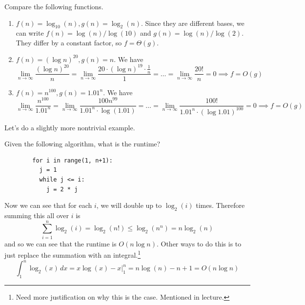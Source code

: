 \documentclass{article}
\begin{document}
    \begin{example}
      Compare the following functions. 
      \begin{enumerate}
        \item $f(n) = \log_{10} (n), g(n) = \log_2 (n)$. Since they are different bases, we can write $f(n) = \log (n) / \log (10)$ and $g(n) = \log(n) / \log(2)$. They differ by a constant factor, so $f = \Theta(g)$. 

        \item $f(n) = (\log n)^{20}, g(n) = n$. We have 
        \begin{equation}
          \lim_{n \rightarrow \infty} \frac{(\log n)^20}{n} = \lim_{n \rightarrow \infty} \frac{20 \cdot (\log n)^{19} \cdot \frac{1}{n}}{1} = \ldots = \lim_{n \rightarrow \infty} \frac{20!}{n} = 0 \implies f = O(g)
        \end{equation}

        \item $f(n) = n^{100}, g(n) = 1.01^n$. We have 
          \begin{equation}
            \lim_{n \rightarrow \infty} \frac{n^{100}}{1.01^n} = \lim_{n \rightarrow \infty} \frac{100 n^{99}}{1.01^n \cdot \log (1.01)} =  \ldots = \lim_{n \rightarrow \infty} \frac{100!}{1.01^n \cdot (\log 1.01)^100} = 0 \implies f = O(g)
          \end{equation}
      \end{enumerate}
    \end{example}

    Let's do a slightly more nontrivial example. 

    \begin{example}
      Given the following algorithm, what is the runtime? 
      \begin{lstlisting}
        for i in range(1, n+1): 
          j = 1 
          while j <= i: 
            j = 2 * j
      \end{lstlisting}
      Now we can see that for each $i$, we will double up to $\log_2 (i)$ times. Therefore summing this all over $i$ is 
      \begin{equation}
        \sum_{i = 1}^n \log_2 (i) = \log_2 (n!) \leq \log_2 (n^n) = n \log_2 (n)
      \end{equation}
      and so we can see that the runtime is $O(n \log n)$. Other ways to do this is to just replace the summation with an integral.\footnote{Need more justification on why this is the case. Mentioned in lecture.} 
      \begin{equation}
        \int_1^n \log_2 (x) \,dx = x \log(x) - x \big|_1^n = n \log(n) - n + 1 = O(n \log n)
      \end{equation}
    \end{example}
\end{document}
